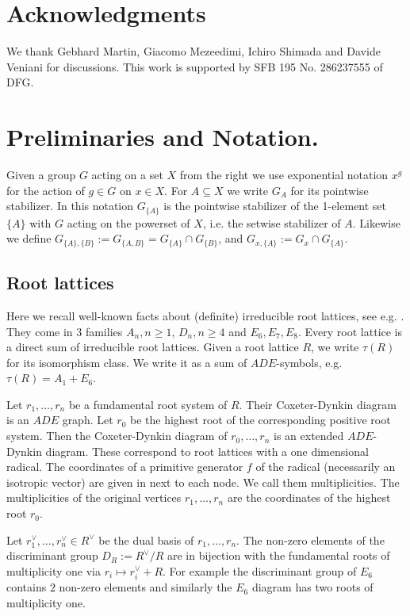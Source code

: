 \documentclass[a4paper]{amsart}
\theoremstyle{definition}
\theoremstyle{plain}
\begin{document}
\section*{Acknowledgments}
We thank Gebhard Martin, Giacomo Mezeedimi, Ichiro Shimada and Davide Veniani for discussions.
This work is supported by SFB 195 No. 286237555 of DFG.

\section{Preliminaries and Notation.}
Given a group $G$ acting on a set $X$ from the right we use exponential notation $x^g$ for the action of $g\in G$ on $x \in X$. 
For $A \subseteq X$ we write $G_A$ for its pointwise stabilizer. In this notation $G_{\{A\}}$ is the pointwise stabilizer of the 1-element set $\{A\}$ with $G$ acting on the powerset of $X$, i.e. the setwise stabilizer of $A$. Likewise we define $G_{\{A\},\{B\}}:=G_{\{A,B\}}=G_{\{A\}}\cap G_{\{B\}}$, and $G_{x,\{A\}}:=G_x \cap G_{\{A\}}$.

\subsection{Root lattices}
Here we recall well-known facts about (definite) irreducible root lattices, see e.g. \cite{ebeling:lattices-and-codes}. They come in $3$ families $A_n,n\geq 1$, $D_n,n\geq 4$ and $E_6,E_7,E_8$. 
Every root lattice is a direct sum of irreducible root lattices.
Given a root lattice $R$, we write $\tau(R)$ for its isomorphism class. 
We write it as a sum of $ADE$-symbols, e.g. $\tau(R) = A_1 + E_6$.

Let $r_1,\dots, r_n$ be a fundamental root system of $R$. Their Coxeter-Dynkin diagram is an $ADE$ graph. 
Let $r_0$ be the highest root of the corresponding positive root system. Then the Coxeter-Dynkin diagram of $r_0,\dots, r_n$
is an extended $ADE$-Dynkin diagram. These correspond to root lattices with a one dimensional radical. 
The coordinates of a primitive generator $f$ of the radical (necessarily an isotropic vector) are given in  next to each node. We call them multiplicities. The multiplicities of the original vertices $r_1,\dots, r_n$ are the coordinates of the highest root $r_0$.

Let $r_1^\vee,\dots,r_n^\vee \in R^\vee$ be the dual basis of $r_1,\dots, r_n$. The non-zero elements of the discriminant group $D_R:=R^\vee/R$
are in bijection with the fundamental roots of multiplicity one via $r_i\mapsto r_i^\vee+R$. For example the discriminant group of $E_6$ contains $2$ non-zero elements and similarly the $E_6$ diagram has two roots of multiplicity one. 
\end{document}
